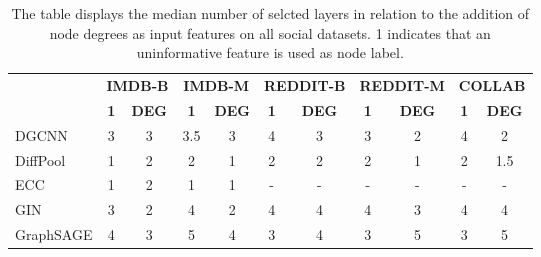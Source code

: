 \begin{table}[h!]

\footnotesize
\renewcommand\arraystretch{1.1}
\caption{The table displays the median number of selcted layers in relation to the addition of node degrees as input features on all social datasets. 1 indicates that an uninformative feature is used as node label.}
\begin{center}
\begin{tabular}{lcccccccccc}
\cmidrule{2-11}
          & \multicolumn{2}{c}{\textbf{IMDB-B}} & \multicolumn{2}{c}{\textbf{IMDB-M}} & \multicolumn{2}{c}{\textbf{REDDIT-B}} & \multicolumn{2}{c}{\textbf{REDDIT-M}} & \multicolumn{2}{c}{\textbf{COLLAB}} \\
          \cmidrule(lr){2-3}\cmidrule(lr){4-5}\cmidrule(lr){6-7}\cmidrule(lr){8-9}\cmidrule(lr){10-11}
          & \textbf{1}           & \textbf{DEG} & \textbf{1}           & \textbf{DEG} & \textbf{1}           & \textbf{DEG} & \textbf{1}           & \textbf{DEG} & \textbf{1}           & \textbf{DEG}          \\
          \midrule
DGCNN     & 3           & 3            & 3.5          & 3           & 4          & 3            & 3          & 2            & 4           & 2            \\
DiffPool  & 1           & 2            & 2            & 1           & 2          & 2            & 2          & 1            & 2           & 1.5          \\
ECC       & 1           & 2            & 1            & 1           & -          & -            & -          & -            & -           & -            \\
GIN       & 3           & 2            & 4            & 2           & 4          & 4            & 4          & 3            & 4           & 4            \\
GraphSAGE & 4           & 3            & 5            & 4           & 3          & 4            & 3          & 5            & 3           & 5\\           
\bottomrule
\end{tabular}
\end{center}
\label{tab:effect-of-degree}
\end{table}
